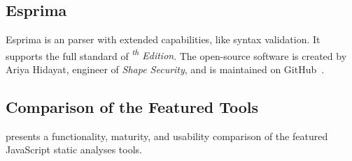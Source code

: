 \subsection{Esprima}

Esprima is an \es parser with extended capabilities, like syntax validation. It supports the full standard of \emph{\textsuperscript{th} Edition}. The open-source software is created by Ariya Hidayat, engineer of \emph{Shape Security}, and is maintained on GitHub~\cite{esprima-github}.


\subsection{Comparison of the Featured Tools}

 presents a functionality, maturity, and usability comparison of the featured JavaScript static analyses tools.

